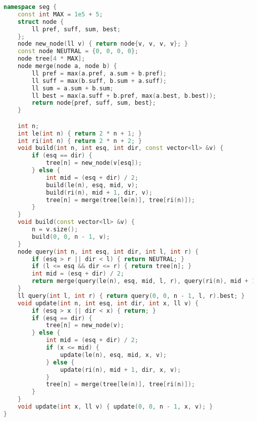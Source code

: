 \documentclass[11pt, a4paper, twoside]{article}
\begin{document}
\begin{lstlisting}[language=C++]
namespace seg {
    const int MAX = 1e5 + 5;
    struct node {
        ll pref, suff, sum, best;
    };
    node new_node(ll v) { return node{v, v, v, v}; }
    const node NEUTRAL = {0, 0, 0, 0};
    node tree[4 * MAX];
    node merge(node a, node b) {
        ll pref = max(a.pref, a.sum + b.pref);
        ll suff = max(b.suff, b.sum + a.suff);
        ll sum = a.sum + b.sum;
        ll best = max(a.suff + b.pref, max(a.best, b.best));
        return node{pref, suff, sum, best};
    }

    int n;
    int le(int n) { return 2 * n + 1; }
    int ri(int n) { return 2 * n + 2; }
    void build(int n, int esq, int dir, const vector<ll> &v) {
        if (esq == dir) {
            tree[n] = new_node(v[esq]);
        } else {
            int mid = (esq + dir) / 2;
            build(le(n), esq, mid, v);
            build(ri(n), mid + 1, dir, v);
            tree[n] = merge(tree[le(n)], tree[ri(n)]);
        }
    }
    void build(const vector<ll> &v) {
        n = v.size();
        build(0, 0, n - 1, v);
    }
    node query(int n, int esq, int dir, int l, int r) {
        if (esq > r || dir < l) { return NEUTRAL; }
        if (l <= esq && dir <= r) { return tree[n]; }
        int mid = (esq + dir) / 2;
        return merge(query(le(n), esq, mid, l, r), query(ri(n), mid + 1, dir, l, r));
    }
    ll query(int l, int r) { return query(0, 0, n - 1, l, r).best; }
    void update(int n, int esq, int dir, int x, ll v) {
        if (esq > x || dir < x) { return; }
        if (esq == dir) {
            tree[n] = new_node(v);
        } else {
            int mid = (esq + dir) / 2;
            if (x <= mid) {
                update(le(n), esq, mid, x, v);
            } else {
                update(ri(n), mid + 1, dir, x, v);
            }
            tree[n] = merge(tree[le(n)], tree[ri(n)]);
        }
    }
    void update(int x, ll v) { update(0, 0, n - 1, x, v); }
}
\end{lstlisting}
\end{document}
